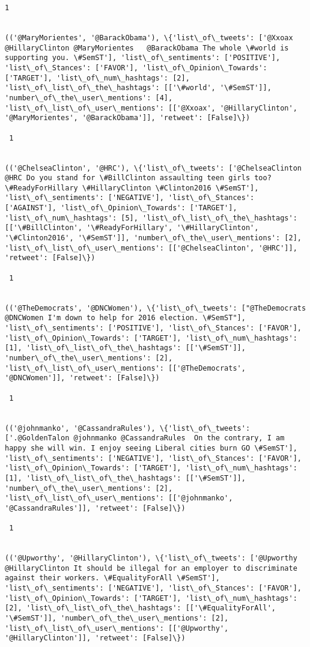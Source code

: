 \documentclass[11pt]{article}
\begin{document}
\begin{Verbatim}[commandchars=\\\{\}]
 1
 

(('@MaryMorientes', '@BarackObama'), \{'list\_of\_tweets': ['@Xxoax @HillaryClinton @MaryMorientes   @BarackObama The whole \#world is supporting you. \#SemST'], 'list\_of\_sentiments': ['POSITIVE'], 'list\_of\_Stances': ['FAVOR'], 'list\_of\_Opinion\_Towards': ['TARGET'], 'list\_of\_num\_hashtags': [2], 'list\_of\_list\_of\_the\_hashtags': [['\#world', '\#SemST']], 'number\_of\_the\_user\_mentions': [4], 'list\_of\_list\_of\_user\_mentions': [['@Xxoax', '@HillaryClinton', '@MaryMorientes', '@BarackObama']], 'retweet': [False]\})

 1
 

(('@ChelseaClinton', '@HRC'), \{'list\_of\_tweets': ['@ChelseaClinton @HRC Do you stand for \#BillClinton assaulting teen girls too? \#ReadyForHillary \#HillaryClinton \#Clinton2016 \#SemST'], 'list\_of\_sentiments': ['NEGATIVE'], 'list\_of\_Stances': ['AGAINST'], 'list\_of\_Opinion\_Towards': ['TARGET'], 'list\_of\_num\_hashtags': [5], 'list\_of\_list\_of\_the\_hashtags': [['\#BillClinton', '\#ReadyForHillary', '\#HillaryClinton', '\#Clinton2016', '\#SemST']], 'number\_of\_the\_user\_mentions': [2], 'list\_of\_list\_of\_user\_mentions': [['@ChelseaClinton', '@HRC']], 'retweet': [False]\})

 1
 

(('@TheDemocrats', '@DNCWomen'), \{'list\_of\_tweets': ["@TheDemocrats @DNCWomen I'm down to help for 2016 election. \#SemST"], 'list\_of\_sentiments': ['POSITIVE'], 'list\_of\_Stances': ['FAVOR'], 'list\_of\_Opinion\_Towards': ['TARGET'], 'list\_of\_num\_hashtags': [1], 'list\_of\_list\_of\_the\_hashtags': [['\#SemST']], 'number\_of\_the\_user\_mentions': [2], 'list\_of\_list\_of\_user\_mentions': [['@TheDemocrats', '@DNCWomen']], 'retweet': [False]\})

 1
 

(('@johnmanko', '@CassandraRules'), \{'list\_of\_tweets': ['.@GoldenTalon @johnmanko @CassandraRules  On the contrary, I am happy she will win. I enjoy seeing Liberal cities burn GO \#SemST'], 'list\_of\_sentiments': ['NEGATIVE'], 'list\_of\_Stances': ['FAVOR'], 'list\_of\_Opinion\_Towards': ['TARGET'], 'list\_of\_num\_hashtags': [1], 'list\_of\_list\_of\_the\_hashtags': [['\#SemST']], 'number\_of\_the\_user\_mentions': [2], 'list\_of\_list\_of\_user\_mentions': [['@johnmanko', '@CassandraRules']], 'retweet': [False]\})

 1
 

(('@Upworthy', '@HillaryClinton'), \{'list\_of\_tweets': ['@Upworthy @HillaryClinton It should be illegal for an employer to discriminate against their workers. \#EqualityForAll \#SemST'], 'list\_of\_sentiments': ['NEGATIVE'], 'list\_of\_Stances': ['FAVOR'], 'list\_of\_Opinion\_Towards': ['TARGET'], 'list\_of\_num\_hashtags': [2], 'list\_of\_list\_of\_the\_hashtags': [['\#EqualityForAll', '\#SemST']], 'number\_of\_the\_user\_mentions': [2], 'list\_of\_list\_of\_user\_mentions': [['@Upworthy', '@HillaryClinton']], 'retweet': [False]\})


\end{Verbatim}
\end{document}
